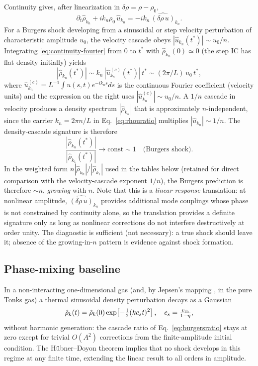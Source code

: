 \documentclass[aps,pre,twocolumn,superscriptaddress,longbibliography,floatfix]{revtex4-2}
\begin{document}
Continuity gives, after linearization in $\delta\rho=\rho-\rho_0$,
\begin{equation}
\partial_t \hat\rho_{k_n} + i k_n \rho_0 \,\hat u_{k_n}
= -i k_n\,\widehat{(\delta\rho\,u)}_{k_n}.
\label{eq:continuity-fourier}
\end{equation}
For a Burgers shock developing from a sinusoidal or step
velocity perturbation of characteristic amplitude $u_0$, the
velocity cascade obeys $|\hat u_{k_n}(t^*)|\sim u_0/n$. Integrating
\eqref{eq:continuity-fourier} from $0$ to $t^*$ with
$\hat\rho_{k_n}(0)\!\simeq\! 0$ (the step IC has flat density
initially) yields
\begin{equation}
|\hat\rho_{k_n}(t^*)| \sim k_n\,|\hat u_{k_n}^{(c)}(t^*)|\,t^*
\sim (2\pi/L)\,u_0\,t^*,
\label{eq:rhouratio}
\end{equation}
where $\hat u_{k_n}^{(c)}=L^{-1}\int u(s,t)e^{-ik_n s}ds$ is the
continuous Fourier coefficient (velocity units) and the
expression on the right uses
$|\hat u_{k_n}^{(c)}|\sim u_0/n$.
A $1/n$ cascade in velocity produces a density spectrum
$|\hat\rho_{k_n}|$ that is approximately $n$-independent, since
the carrier $k_n=2\pi n/L$ in Eq.~\eqref{eq:rhouratio} multiplies
$|\hat u_{k_n}|\sim 1/n$. The density-cascade signature is
therefore
\begin{equation}
\frac{|\hat\rho_{k_n}(t^*)|}{|\hat\rho_{k_1}(t^*)|}
\to \mathrm{const}\sim 1
\quad\text{(Burgers shock)}.
\end{equation}
In the weighted form
$n|\hat\rho_{k_n}|/|\hat\rho_{k_1}|$ used in the tables below
(retained for direct comparison with the velocity-cascade
exponent $1/n$), the Burgers prediction is therefore $\sim n$,
\emph{growing} with $n$. Note that this is a
\emph{linear-response} translation: at nonlinear amplitude,
$\widehat{(\delta\rho\,u)}_{k_n}$ provides additional mode
couplings whose phase is not constrained by continuity alone,
so the translation provides a definite signature only as long
as nonlinear corrections do not interfere destructively at
order unity. The diagnostic is sufficient (not necessary): a
true shock should leave it; absence of the growing-in-$n$
pattern is evidence against shock formation.

\subsection{Phase-mixing baseline}

In a non-interacting one-dimensional gas (and, by Jepsen's
mapping \cite{Jepsen1965}, in the pure Tonks gas) a thermal
sinusoidal density perturbation decays as a Gaussian
\cite{Lebowitz1968}
\begin{equation}
\hat\rho_k(t) = \hat\rho_k(0)\exp\!\left[-\tfrac{1}{2}(k c_s t)^2\right],
\quad c_s=\tfrac{v_{\rm th}}{1-\eta},
\label{eq:phasemix}
\end{equation}
without harmonic generation: the cascade ratio of
Eq.~\eqref{eq:burgersratio} stays at zero except for trivial
$O(A^2)$ corrections from the finite-amplitude initial condition.
The H\"ubner--Doyon theorem \cite{HubnerDoyon2024} implies that
no shock develops in this regime at any finite time, extending
the linear result to all orders in amplitude.
\end{document}

